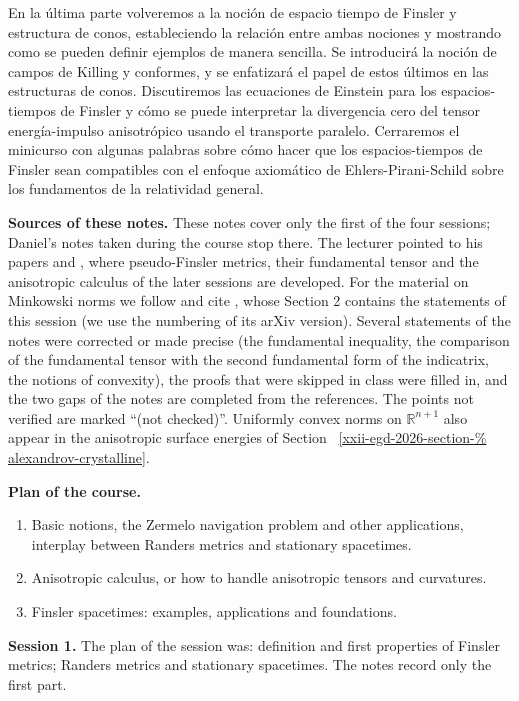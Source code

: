 En la última parte volveremos a la noción de
espacio tiempo de Finsler y estructura de
conos, estableciendo la relación entre ambas
nociones y mostrando como se pueden definir
ejemplos de manera sencilla. Se introducirá
la noción de campos de Killing y conformes, y
se enfatizará el papel de estos últimos en
las estructuras de conos. Discutiremos las
ecuaciones de Einstein para los
espacios-tiempos de Finsler y cómo se puede
interpretar la divergencia cero del tensor
energía-impulso anisotrópico usando el
transporte paralelo. Cerraremos el minicurso
con algunas palabras sobre cómo hacer que los
espacios-tiempos de Finsler sean compatibles
con el enfoque axiomático de
Ehlers-Pirani-Schild sobre los fundamentos de
la relatividad general.

\medskip\noindent
{\bf Sources of these notes.}
These notes cover only the first of the four
sessions; Daniel's notes taken during the
course stop there. The lecturer pointed to
his papers \cite{javaloyes2014chern} and
\cite{javaloyes2019anisotropic}, where
pseudo-Finsler metrics, their fundamental
tensor and the anisotropic calculus of the
later sessions are developed. For the
material on Minkowski norms we follow and
cite \cite{javaloyes2014definition}, whose
Section 2 contains the statements of this
session (we use the numbering of its arXiv
version). Several statements of the notes
were corrected or made precise (the
fundamental inequality, the comparison of
the fundamental tensor with the second
fundamental form of the indicatrix, the
notions of convexity), the proofs that were
skipped in class were filled in, and the
two gaps of the notes are completed from
the references. The points not verified are
marked ``(not checked)''. Uniformly convex
norms on $\mathbb{R}^{n+1}$ also appear in
the anisotropic surface energies of
Section~%
\ref{xxii-egd-2026-section-%
alexandrov-crystalline}.

\medskip\noindent
{\bf Plan of the course.}
\begin{enumerate}
\item Basic notions, the Zermelo navigation
problem and other applications, interplay
between Randers metrics and stationary
spacetimes.
\item Anisotropic calculus, or how to handle
anisotropic tensors and curvatures.
\item Finsler spacetimes: examples,
applications and foundations.
\end{enumerate}

\medskip\noindent
{\bf Session 1.}
The plan of the session was: definition and
first properties of Finsler metrics; Randers
metrics and stationary spacetimes. The notes
record only the first part.

